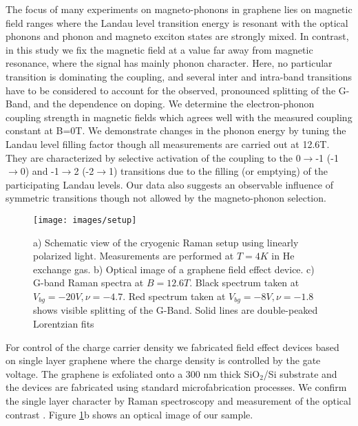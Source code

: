 \documentclass[prl,aps,superscriptaddress,showpacs,reprint]{revtex4-1}
\begin{document}
The focus of many experiments on magneto-phonons in graphene lies on magnetic field ranges where the Landau level transition energy is resonant with the optical phonons and phonon and magneto exciton states are strongly mixed. In contrast, in this study we fix the magnetic field at a value far away from magnetic resonance, where the signal has mainly phonon character. Here, no particular transition is dominating the coupling, and several inter and intra-band transitions have to be considered to account for the observed, pronounced splitting of the G-Band, and the dependence on doping. We determine the electron-phonon coupling strength in magnetic fields which agrees well with the measured  coupling constant at B=0T. We demonstrate changes in the phonon energy by tuning the Landau level filling factor though all measurements are carried out at 12.6T. They are characterized by selective activation of the coupling to the 0$\rightarrow$-1 (-1$\rightarrow$0) and -1$\rightarrow$2 (-2$\rightarrow$1) transitions due to the filling (or emptying) of the participating Landau levels. Our data also suggests an observable influence of symmetric transitions though not allowed by the magneto-phonon selection.

\begin{figure}
   \texttt{[image: images/setup]}
   \caption{\label{setup}a) Schematic view of the cryogenic Raman setup using linearly polarized light. Measurements are performed at $T=4K$ in He exchange gas. b) Optical image of a graphene field effect device. c) G-band Raman spectra at $B=12.6T$. Black spectrum taken at $V_{bg}=-20V, \nu=-4.7$. Red spectrum taken at $V_{bg}=-8V,\nu=-1.8$ shows visible splitting of the G-Band. Solid lines are double-peaked Lorentzian fits}
\end{figure}

For control of the charge carrier density we fabricated field effect devices based on single layer graphene  where the charge density is controlled by the gate voltage. The graphene is exfoliated onto a 300 nm thick SiO$_2$/Si substrate and the devices are fabricated using standard microfabrication processes.  We confirm the single layer character by Raman spectroscopy and measurement of the optical contrast \cite{ferrari2006raman,casiraghi2007rayleigh,ni2007graphene,blake2007making}. Figure \ref{setup}b shows an optical image of our sample.
\end{document}
